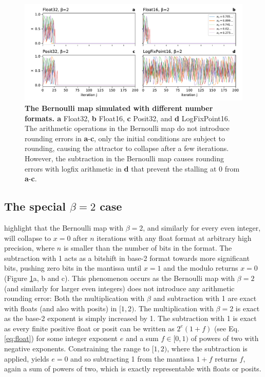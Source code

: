 \begin{figure}[tbhp]
	\includegraphics[width=1\textwidth]{Figures/orbits/beta2.pdf}
	\caption{\textbf{The Bernoulli map simulated with different number formats. a}
	Float32, \textbf{b} Float16, \textbf{c} Posit32, and \textbf{d} LogFixPoint16. The arithmetic operations in the
	Bernoulli map do not introduce rounding errors in \textbf{a}-\textbf{c}, only the initial conditions are subject
	to rounding, causing the attractor to collapse after a few iterations. However, the subtraction in the Bernoulli
	map causes rounding errors with logfix arithmetic in \textbf{d} that prevent the stalling at 0 from \textbf{a}-\textbf{c}.}
	\label{fig:orbits_beta2}
\end{figure}

\subsection{The special $\beta = 2$ case}
\label{sec:orbits_beta2}

\cite{Boghosian2019} highlight that the Bernoulli map with $\beta = 2$, and similarly for every even integer, will collapse to $x=0$
after $n$ iterations with any float format at arbitrary high precision, where $n$ is smaller than the number of bits in the format.
The subtraction with 1 acts as a bitshift in base-2 format towards more significant bits, pushing zero bits in the mantissa until $x=1$
and the modulo returns $x = 0$ (Figure \ref{fig:orbits_beta2}a, b and c). This phenomenon occurs
as the Bernoulli map with $\beta=2$ (and similarly for larger even integers) does not introduce any arithmetic rounding error: Both the
multiplication with $\beta$ and subtraction with 1 are exact with floats (and also with posits) in $[1,2)$. The multiplication with $\beta=2$
is exact as the base-2 exponent is simply increased by 1. The subtraction with 1 is exact as every finite positive float
or posit can be written as $2^e(1+f)$ (see Eq. \ref{eq:float}) for some integer exponent $e$ and a sum $f \in [0,1)$ of powers of two
with negative exponents. Constraining the range to $[1,2)$, where the subtraction is applied, yields $e=0$ and so subtracting 1 from 
the mantissa $1+f$ returns $f$, again a sum of powers of two, which is exactly representable with floats or posits.

